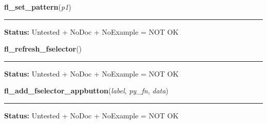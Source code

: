     \vspace{0.5ex}

\hspace{.8\funcindent}\begin{boxedminipage}{\funcwidth}

    \raggedright \textbf{fl\_set\_pattern}(\textit{p1})

    \vspace{-1.5ex}

    \rule{\textwidth}{0.5\fboxrule}
\setlength{\parskip}{2ex}
\setlength{\parskip}{1ex}
\textbf{Status:} Untested + NoDoc + NoExample = NOT OK



    \end{boxedminipage}

    \label{xformslib:library:fl_refresh_fselector}

    \vspace{0.5ex}

\hspace{.8\funcindent}\begin{boxedminipage}{\funcwidth}

    \raggedright \textbf{fl\_refresh\_fselector}()

    \vspace{-1.5ex}

    \rule{\textwidth}{0.5\fboxrule}
\setlength{\parskip}{2ex}
\setlength{\parskip}{1ex}
\textbf{Status:} Untested + NoDoc + NoExample = NOT OK



    \end{boxedminipage}

    \label{xformslib:library:fl_add_fselector_appbutton}

    \vspace{0.5ex}

\hspace{.8\funcindent}\begin{boxedminipage}{\funcwidth}

    \raggedright \textbf{fl\_add\_fselector\_appbutton}(\textit{label}, \textit{py\_fn}, \textit{data})

    \vspace{-1.5ex}

    \rule{\textwidth}{0.5\fboxrule}
\setlength{\parskip}{2ex}
\setlength{\parskip}{1ex}
\textbf{Status:} Untested + NoDoc + NoExample = NOT OK



    \end{boxedminipage}

